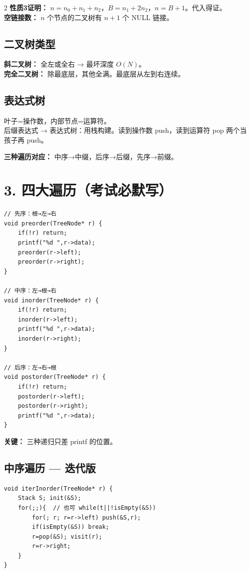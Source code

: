 \documentclass[10pt,a4paper]{article}
\begin{document}
\begin{multicols}{2}
\textbf{性质3证明：} $n=n_0+n_1+n_2$，$B=n_1+2n_2$，$n=B+1$。代入得证。\\
\textbf{空链接数：} $n$ 个节点的二叉树有 $n+1$ 个 NULL 链接。

\subsection*{二叉树类型}

\textbf{斜二叉树：} 全左或全右 → 最坏深度 $O(N)$。\\
\textbf{完全二叉树：} 除最底层，其他全满。最底层从左到右连续。

\subsection*{表达式树}

叶子=操作数，内部节点=运算符。\\
后缀表达式 → 表达式树：用栈构建。读到操作数 push，读到运算符 pop 两个当孩子再 push。

\textbf{三种遍历对应：} 中序→中缀，后序→后缀，先序→前缀。

\columnbreak

\section*{3. 四大遍历（考试必默写）}

\begin{lstlisting}
// 先序：根→左→右
void preorder(TreeNode* r) {
    if(!r) return;
    printf("%d ",r->data);
    preorder(r->left);
    preorder(r->right);
}

// 中序：左→根→右
void inorder(TreeNode* r) {
    if(!r) return;
    inorder(r->left);
    printf("%d ",r->data);
    inorder(r->right);
}

// 后序：左→右→根
void postorder(TreeNode* r) {
    if(!r) return;
    postorder(r->left);
    postorder(r->right);
    printf("%d ",r->data);
}
\end{lstlisting}

\textbf{关键：} 三种递归只差 printf 的位置。

\subsection*{中序遍历 — 迭代版}

\begin{lstlisting}
void iterInorder(TreeNode* r) {
    Stack S; init(&S);
    for(;;){  // 也可 while(t||!isEmpty(&S))
        for(; r; r=r->left) push(&S,r);
        if(isEmpty(&S)) break;
        r=pop(&S); visit(r);
        r=r->right;
    }
}
\end{lstlisting}


\end{multicols}
\end{document}
